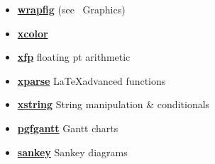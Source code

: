 \begin{itemize}[label=-,leftmargin=*]
    \item \textbf{\href{http://mirrors.ctan.org/macros/latex/contrib/wrapfig/wrapfig-doc.pdf}{wrapfig}} \tabto*{15mm} (see \textsection\ Graphics)
    \item \textbf{\href{http://mirrors.ctan.org/macros/latex/contrib/xcolor/xcolor.pdf}{xcolor}} \tabto*{15mm} 
    \item \textbf{\href{http://mirrors.ctan.org/macros/latex/contrib/l3packages/xfp.pdf}{xfp}} \tabto*{15mm} floating pt arithmetic
    \item \textbf{\href{http://mirrors.ctan.org/macros/latex/contrib/l3packages/xparse.pdf}{xparse}} \tabto*{15mm} \LaTeX advanced functions 
    \item \textbf{\href{http://mirrors.ctan.org/macros/generic/xstring/xstring-en.pdf}{xstring}} \tabto*{15mm} String manipulation \& conditionals
    \item \textbf{\href{http://mirrors.ctan.org/graphics/pgf/contrib/pgfgantt/pgfgantt.pdf}{pgfgantt}} \tabto*{15mm} Gantt charts
    \item \textbf{\href{http://mirrors.ctan.org/graphics/pgf/contrib/sankey/sankey.pdf}{sankey}} \tabto*{15mm} Sankey diagrams
\end{itemize}


